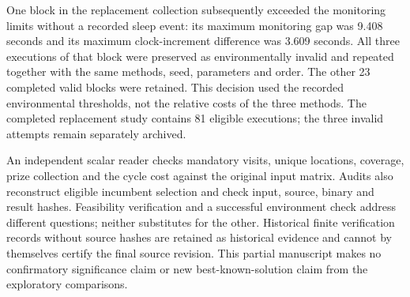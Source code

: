 One block in the replacement collection subsequently exceeded the monitoring
limits without a recorded sleep event: its maximum monitoring gap was
9.408 seconds and its maximum clock-increment difference was 3.609 seconds.
All three executions of that block were preserved as environmentally invalid
and repeated together with the same methods, seed, parameters and order.
The other 23 completed valid blocks were retained. This decision used the
recorded environmental thresholds, not the relative costs of the three
methods. The completed replacement study contains 81 eligible executions;
the three invalid attempts remain separately archived.

An independent scalar reader checks mandatory visits, unique locations,
coverage, prize collection and the cycle cost against the original input
matrix. Audits also reconstruct eligible incumbent selection and check
input, source, binary and result hashes. Feasibility verification and a
successful environment check address different questions; neither substitutes
for the other. Historical finite verification records without source hashes
are retained as historical evidence and cannot by themselves certify the
final source revision. This partial manuscript makes no confirmatory
significance claim or new best-known-solution claim from the exploratory
comparisons.
